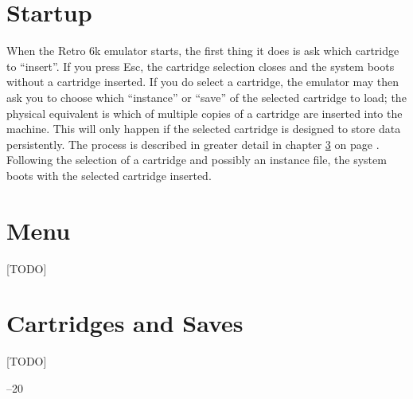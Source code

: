 \documentclass[12pt]{{memoir}}
\begin{document}
\chapter{Startup}

When the Retro 6k emulator starts, the first thing it does is ask which cartridge to ``insert''. If you press \textsf{Esc}, the cartridge selection closes and the system boots without a cartridge inserted. If you do select a cartridge, the emulator may then ask you to choose which ``instance'' or ``save'' of the selected cartridge to load; the physical equivalent is which of multiple copies of a cartridge are inserted into the machine. This will only happen if the selected cartridge is designed to store data persistently. The process is described in greater detail in chapter \ref{ch:cartridges} on page \pageref{ch:cartridges}. Following the selection of a cartridge and possibly an instance file, the system boots with the selected cartridge inserted.

\chapter{Menu}

[TODO]

\chapter{Cartridges and Saves}
\label{ch:cartridges}

[TODO]

\cleartoverso
\pagestyle{empty}

\noindent\thetitle\hfill{}--20 \theauthor
\end{document}
